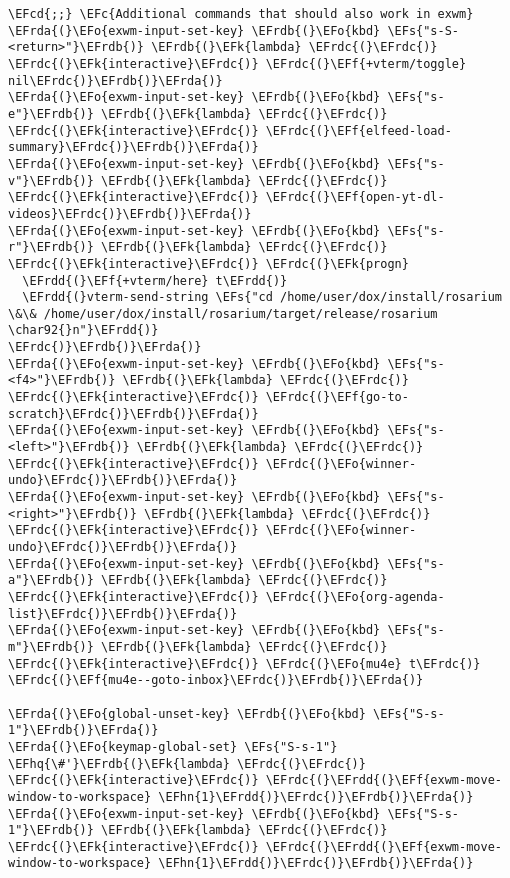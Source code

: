 \documentclass[a4wide,10pt]{article}
\newcommand{\EFc}[1]{\textcolor{EFc}{#1}} %
\newcommand{\EFcd}[1]{\textcolor{EFcd}{#1}} %
\newcommand{\EFs}[1]{\textcolor{EFs}{#1}} %
\newcommand{\EFk}[1]{\textcolor{EFk}{#1}} %
\newcommand{\EFf}[1]{\textcolor{EFf}{#1}} %
\newcommand{\EFo}[1]{\textcolor{EFo}{#1}} %
\newcommand{\EFhn}[1]{\textcolor{EFhn}{\textbf{#1}}} %
\newcommand{\EFhq}[1]{\textcolor{EFhq}{#1}} %
\newcommand{\EFrda}[1]{\textcolor{EFrda}{#1}} %
\newcommand{\EFrdb}[1]{\textcolor{EFrdb}{#1}} %
\newcommand{\EFrdc}[1]{\textcolor{EFrdc}{#1}} %
\newcommand{\EFrdd}[1]{\textcolor{EFrdd}{#1}} %
\begin{document}
\begin{Code}
\begin{Verbatim}
\EFcd{;;} \EFc{Additional commands that should also work in exwm}
\EFrda{(}\EFo{exwm-input-set-key} \EFrdb{(}\EFo{kbd} \EFs{"s-S-<return>"}\EFrdb{)} \EFrdb{(}\EFk{lambda} \EFrdc{(}\EFrdc{)} \EFrdc{(}\EFk{interactive}\EFrdc{)} \EFrdc{(}\EFf{+vterm/toggle} nil\EFrdc{)}\EFrdb{)}\EFrda{)}
\EFrda{(}\EFo{exwm-input-set-key} \EFrdb{(}\EFo{kbd} \EFs{"s-e"}\EFrdb{)} \EFrdb{(}\EFk{lambda} \EFrdc{(}\EFrdc{)} \EFrdc{(}\EFk{interactive}\EFrdc{)} \EFrdc{(}\EFf{elfeed-load-summary}\EFrdc{)}\EFrdb{)}\EFrda{)}
\EFrda{(}\EFo{exwm-input-set-key} \EFrdb{(}\EFo{kbd} \EFs{"s-v"}\EFrdb{)} \EFrdb{(}\EFk{lambda} \EFrdc{(}\EFrdc{)} \EFrdc{(}\EFk{interactive}\EFrdc{)} \EFrdc{(}\EFf{open-yt-dl-videos}\EFrdc{)}\EFrdb{)}\EFrda{)}
\EFrda{(}\EFo{exwm-input-set-key} \EFrdb{(}\EFo{kbd} \EFs{"s-r"}\EFrdb{)} \EFrdb{(}\EFk{lambda} \EFrdc{(}\EFrdc{)} \EFrdc{(}\EFk{interactive}\EFrdc{)} \EFrdc{(}\EFk{progn}
  \EFrdd{(}\EFf{+vterm/here} t\EFrdd{)}
  \EFrdd{(}vterm-send-string \EFs{"cd /home/user/dox/install/rosarium \&\& /home/user/dox/install/rosarium/target/release/rosarium \char92{}n"}\EFrdd{)}
\EFrdc{)}\EFrdb{)}\EFrda{)}
\EFrda{(}\EFo{exwm-input-set-key} \EFrdb{(}\EFo{kbd} \EFs{"s-<f4>"}\EFrdb{)} \EFrdb{(}\EFk{lambda} \EFrdc{(}\EFrdc{)} \EFrdc{(}\EFk{interactive}\EFrdc{)} \EFrdc{(}\EFf{go-to-scratch}\EFrdc{)}\EFrdb{)}\EFrda{)}
\EFrda{(}\EFo{exwm-input-set-key} \EFrdb{(}\EFo{kbd} \EFs{"s-<left>"}\EFrdb{)} \EFrdb{(}\EFk{lambda} \EFrdc{(}\EFrdc{)} \EFrdc{(}\EFk{interactive}\EFrdc{)} \EFrdc{(}\EFo{winner-undo}\EFrdc{)}\EFrdb{)}\EFrda{)}
\EFrda{(}\EFo{exwm-input-set-key} \EFrdb{(}\EFo{kbd} \EFs{"s-<right>"}\EFrdb{)} \EFrdb{(}\EFk{lambda} \EFrdc{(}\EFrdc{)} \EFrdc{(}\EFk{interactive}\EFrdc{)} \EFrdc{(}\EFo{winner-undo}\EFrdc{)}\EFrdb{)}\EFrda{)}
\EFrda{(}\EFo{exwm-input-set-key} \EFrdb{(}\EFo{kbd} \EFs{"s-a"}\EFrdb{)} \EFrdb{(}\EFk{lambda} \EFrdc{(}\EFrdc{)} \EFrdc{(}\EFk{interactive}\EFrdc{)} \EFrdc{(}\EFo{org-agenda-list}\EFrdc{)}\EFrdb{)}\EFrda{)}
\EFrda{(}\EFo{exwm-input-set-key} \EFrdb{(}\EFo{kbd} \EFs{"s-m"}\EFrdb{)} \EFrdb{(}\EFk{lambda} \EFrdc{(}\EFrdc{)} \EFrdc{(}\EFk{interactive}\EFrdc{)} \EFrdc{(}\EFo{mu4e} t\EFrdc{)} \EFrdc{(}\EFf{mu4e--goto-inbox}\EFrdc{)}\EFrdb{)}\EFrda{)}

\EFrda{(}\EFo{global-unset-key} \EFrdb{(}\EFo{kbd} \EFs{"S-s-1"}\EFrdb{)}\EFrda{)}
\EFrda{(}\EFo{keymap-global-set} \EFs{"S-s-1"} \EFhq{\#'}\EFrdb{(}\EFk{lambda} \EFrdc{(}\EFrdc{)} \EFrdc{(}\EFk{interactive}\EFrdc{)} \EFrdc{(}\EFrdd{(}\EFf{exwm-move-window-to-workspace} \EFhn{1}\EFrdd{)}\EFrdc{)}\EFrdb{)}\EFrda{)}
\EFrda{(}\EFo{exwm-input-set-key} \EFrdb{(}\EFo{kbd} \EFs{"S-s-1"}\EFrdb{)} \EFrdb{(}\EFk{lambda} \EFrdc{(}\EFrdc{)} \EFrdc{(}\EFk{interactive}\EFrdc{)} \EFrdc{(}\EFrdd{(}\EFf{exwm-move-window-to-workspace} \EFhn{1}\EFrdd{)}\EFrdc{)}\EFrdb{)}\EFrda{)}


\end{Verbatim}
\end{Code}
\end{document}
